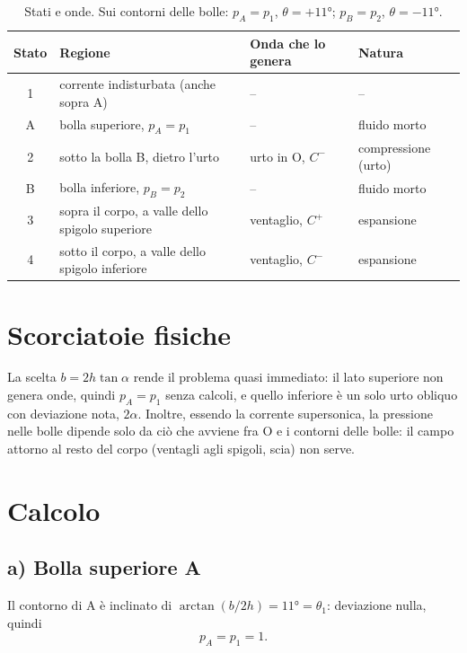 \documentclass[11pt,a4paper]{article}
\newcommand{\Cp}{C^{+}}
\newcommand{\Cm}{C^{-}}
\begin{document}
\begin{table}[H]
  \centering
  \small
  \begin{tabular}{clll}
    \toprule
    Stato & Regione & Onda che lo genera & Natura \\
    \midrule
    1 & corrente indisturbata (anche sopra A) & -- & -- \\
    A & bolla superiore, $p_A=p_1$ & -- & fluido morto \\
    2 & sotto la bolla B, dietro l'urto & urto in O, $\Cm$ & compressione (urto) \\
    B & bolla inferiore, $p_B=p_2$ & -- & fluido morto \\
    3 & sopra il corpo, a valle dello spigolo superiore & ventaglio, $\Cp$ & espansione \\
    4 & sotto il corpo, a valle dello spigolo inferiore & ventaglio, $\Cm$ & espansione \\
    \bottomrule
  \end{tabular}
  \caption{Stati e onde. Sui contorni delle bolle: $p_A=p_1$, $\theta=+\ang{11}$; $p_B=p_2$, $\theta=-\ang{11}$.}
\end{table}

\section{Scorciatoie fisiche}
La scelta $b=2h\tan\alpha$ rende il problema quasi immediato: il lato superiore non genera onde, quindi $p_A=p_1$
senza calcoli, e quello inferiore è un solo urto obliquo con deviazione nota, $2\alpha$. Inoltre, essendo la corrente
supersonica, la pressione nelle bolle dipende solo da ciò che avviene fra O e i contorni delle bolle: il campo
attorno al resto del corpo (ventagli agli spigoli, scia) non serve.

\section{Calcolo}

\subsection*{a) Bolla superiore A}
Il contorno di A è inclinato di $\arctan\!\left(b/2h\right)=\ang{11}=\theta_1$: deviazione nulla, quindi
\[
p_A=p_1=1 .
\]
\end{document}
